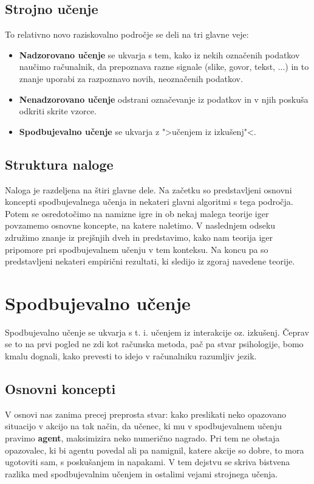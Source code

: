 \documentclass[12pt,a4paper]{amsart}
\theoremstyle{definition} %
\theoremstyle{plain} %
\begin{document}
\subsection{Strojno učenje}
To relativno novo raziskovalno področje se deli na tri glavne veje:
\begin{itemize}
    \item \textbf{Nadzorovano učenje} se ukvarja s tem, kako iz nekih označenih podatkov 
            naučimo računalnik, da prepoznava razne signale (slike, govor, tekst, ...)
            in to znanje uporabi za razpoznavo novih, neoznačenih podatkov.
    \item \textbf{Nenadzorovano učenje} odstrani označevanje iz podatkov in v njih poskuša 
            odkriti skrite vzorce.
    \item \textbf{Spodbujevalno učenje} se ukvarja z ">učenjem iz izkušenj"<.
\end{itemize}

\subsection{Struktura naloge}
Naloga je razdeljena na štiri glavne dele. Na začetku so predstavljeni osnovni koncepti 
spodbujevalnega učenja in nekateri glavni algoritmi s tega področja. Potem se osredotočimo na 
namizne igre in ob nekaj malega teorije iger povzamemo osnovne koncepte, na katere naletimo. 
V naslednjem odseku združimo znanje iz prejšnjih dveh in predstavimo, kako nam teorija iger 
pripomore pri spodbujevalnem učenju v tem konteksu. Na koncu pa so predstavljeni nekateri empirični
rezultati, ki sledijo iz zgoraj navedene teorije.

\section{Spodbujevalno učenje}
Spodbujevalno učenje se ukvarja s t. i. učenjem iz interakcije oz. izkušenj. Čeprav se to na prvi 
pogled ne zdi kot računska metoda, pač pa stvar psihologije, bomo kmalu dognali, kako prevesti 
to idejo v računalniku razumljiv jezik.

\subsection{Osnovni koncepti}
V osnovi nas zanima precej preprosta stvar: kako preslikati neko opazovano situacijo v akcijo na 
tak način, da učenec, ki mu v spodbujevalnem učenju pravimo \textbf{agent}, maksimizira neko 
numerično nagrado. Pri tem ne obstaja opazovalec, ki bi agentu povedal ali pa namignil, katere 
akcije so dobre, to mora ugotoviti sam, s poskušanjem in napakami. V tem dejstvu se skriva 
bistvena razlika med spodbujevalnim učenjem in ostalimi vejami strojnega učenja. 
\end{document}
